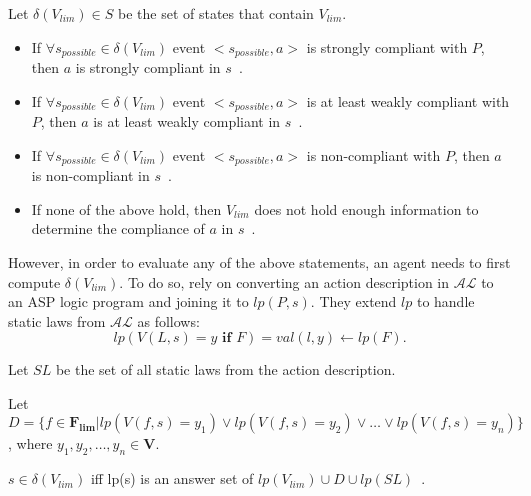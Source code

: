 \begin{definition}
    Let $\delta(V_{lim}) \in S$ be the set of states that contain $V_{lim}$.

    \begin{itemize}
        \item If $\forall s_{possible} \in \delta(V_{lim})$ event $<s_{possible}, a>$ is strongly compliant with $P$, then $a$ is strongly compliant in $s$~\citep{gelfond_authorization_2008}.
        \item If $\forall s_{possible} \in \delta(V_{lim})$ event $<s_{possible}, a>$ is at least weakly compliant with $P$, then $a$ is at least weakly compliant in $s$~\citep{gelfond_authorization_2008}.
        \item If $\forall s_{possible} \in \delta(V_{lim})$ event $<s_{possible}, a>$ is non-compliant with $P$, then $a$ is non-compliant in $s$~\citep{gelfond_authorization_2008}.
        \item If none of the above hold, then $V_{lim}$ does not hold enough information to determine the compliance of $a$ in $s$~\citep{gelfond_authorization_2008}.
    \end{itemize}
\end{definition}

However, in order to evaluate any of the above statements, an agent needs to first compute $\delta(V_{lim})$.
To do so, \citet{gelfond_authorization_2008} rely on converting an action description in $\mathcal{AL}$ to an ASP logic program and joining it to $lp(P, s)$.
They extend $lp$ to handle static laws from $\mathcal{AL}$ as follows:
\begin{equation}
    lp(V(L,s)=y \textbf{ if } F) = val(l, y) \leftarrow lp(F).
\end{equation}

Let $SL$ be the set of all static laws from the action description.

Let $D = \{ f \in \boldsymbol{F_{lim}} | lp(V(f,s)=y_1) \lor lp(V(f,s)=y_2) \lor \dots \lor lp(V(f,s)=y_n)\}$, where $y_1, y_2, \dots, y_n \in \boldsymbol{V}$.

\begin{definition}
    $s \in \delta(V_{lim})$ iff lp(s) is an answer set of $lp(V_{lim}) \cup D \cup lp(SL)$~\citep{gelfond_authorization_2008}.
\end{definition}

